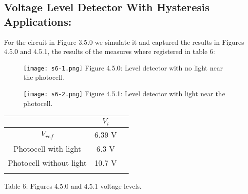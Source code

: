 \subsection{Voltage Level Detector With Hysteresis Applications:}

For the circuit in Figure 3.5.0 we simulate it and captured the results in Figures 4.5.0 and 4.5.1, the results of the measures where registered in table 6:

\begin{figure}[H]
\texttt{[image: s6-1.png]}
\centering \linebreak \linebreak Figure 4.5.0: Level detector with no light near the photocell.
\end{figure} \hfill

\begin{figure}[H]
\texttt{[image: s6-2.png]}
\centering \linebreak \linebreak Figure 4.5.1: Level detector with light near the photocell.
\end{figure} \hfill

\begin{center}
\begin{tabular}[.5cm]{c c c}
\toprule
\toprule
\hspace{200pt} & \hspace{100pt} $V_{i}$ \hspace{100pt}  \\
\midrule
\midrule
$V_{ref}$ & 6.39 V \\
\cmidrule{1-2}
Photocell with light & 6.3 V \\
\cmidrule{1-2}
Photocell without light & 10.7 V \\
\bottomrule
\linebreak
\end{tabular}
\linebreak Table 6: Figures 4.5.0 and 4.5.1 voltage levels.
\end{center} \hfill
